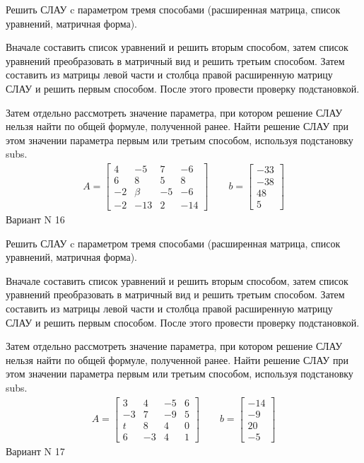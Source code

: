 \documentclass[11pt]{report}
\begin{document}
Решить СЛАУ c параметром тремя способами (расширенная матрица, список уравнений, матричная форма).

Вначале составить список уравнений и решить вторым способом,
затем список уравнений преобразовать в матричный вид и решить третьим способом.
Затем составить из матрицы левой части и столбца правой расширенную матрицу СЛАУ и решить первым способом.
После этого провести проверку подстановкой.

Затем отдельно рассмотреть значение параметра, при котором решение СЛАУ нельзя найти по общей формуле,
полученной ранее.
Найти решение СЛАУ при этом значении параметра первым или третьим способом, используя подстановку subs.
\begin{align*}
    A = \left[\begin{matrix}4 & -5 & 7 & -6\\6 & 8 & 5 & 8\\-2 & \beta & -5 & -6\\-2 & -13 & 2 & -14\end{matrix}\right]
\qquad b = \left[\begin{matrix}-33\\-38\\48\\5\end{matrix}\right]
\end{align*}
\newpage
Вариант N 16


Решить СЛАУ c параметром тремя способами (расширенная матрица, список уравнений, матричная форма).

Вначале составить список уравнений и решить вторым способом,
затем список уравнений преобразовать в матричный вид и решить третьим способом.
Затем составить из матрицы левой части и столбца правой расширенную матрицу СЛАУ и решить первым способом.
После этого провести проверку подстановкой.

Затем отдельно рассмотреть значение параметра, при котором решение СЛАУ нельзя найти по общей формуле,
полученной ранее.
Найти решение СЛАУ при этом значении параметра первым или третьим способом, используя подстановку subs.
\begin{align*}
    A = \left[\begin{matrix}3 & 4 & -5 & 6\\-3 & 7 & -9 & 5\\t & 8 & 4 & 0\\6 & -3 & 4 & 1\end{matrix}\right]
\qquad b = \left[\begin{matrix}-14\\-9\\20\\-5\end{matrix}\right]
\end{align*}
\newpage
Вариант N 17
\end{document}
